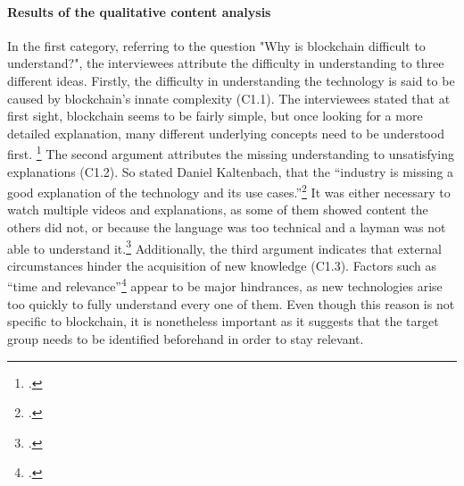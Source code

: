 \paragraph{Results of the qualitative content analysis} In the first category, referring to the question "Why is blockchain difficult to understand?", the interviewees attribute the difficulty in understanding to three different ideas. Firstly, the difficulty in understanding the technology is said to be caused by blockchain's innate complexity (C1.1). The interviewees stated that at first sight, blockchain seems to be fairly simple, but once looking for a more detailed explanation, many different underlying concepts need to be understood first. \footcites[Cf.][P73, P74, P75]{DanielKaltenbach_Interview}[cf.][P113]{RalphBeckmann_Interview} The second argument attributes the missing understanding to unsatisfying explanations (C1.2). So stated Daniel Kaltenbach, that the \enquote{industry is missing a good explanation of the technology and its use cases.}\footcite[][P5]{DanielKaltenbach_Interview} It was either necessary to watch multiple videos and explanations, as some of them showed content the others did not, or because the language was too technical and a layman was not able to understand it.\footcites[Cf.][P7, P8, P19, P20 ]{DanielKaltenbach_Interview}[cf.][P131]{RalphBeckmann_Interview} Additionally, the third argument indicates that external circumstances hinder the acquisition of new knowledge (C1.3). Factors such as \enquote{time and relevance}\footcite[][P9]{DanielKaltenbach_Interview} appear to be major hindrances, as new technologies arise too quickly to fully understand every one of them. Even though this reason is not specific to blockchain, it is nonetheless important as it suggests that the target group needs to be identified beforehand in order to stay relevant.

